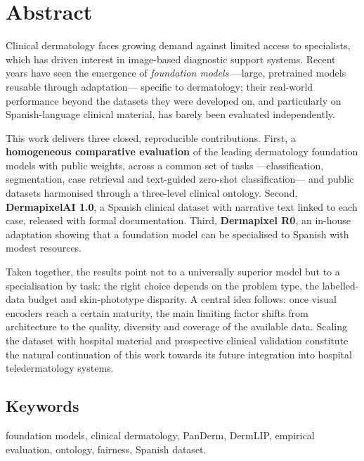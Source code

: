 
\chapter*{Abstract}
\vspace*{0.4cm}

Clinical dermatology faces growing demand against limited access to specialists, which has driven interest in image-based diagnostic support systems. Recent years have seen the emergence of \emph{foundation models} ---large, pretrained models reusable through adaptation--- specific to dermatology; their real-world performance beyond the datasets they were developed on, and particularly on Spanish-language clinical material, has barely been evaluated independently.
\par This work delivers three closed, reproducible contributions. First, a \textbf{homogeneous comparative evaluation} of the leading dermatology foundation models with public weights, across a common set of tasks ---classification, segmentation, case retrieval and text-guided zero-shot classification--- and public datasets harmonised through a three-level clinical ontology. Second, \textbf{DermapixelAI 1.0}, a Spanish clinical dataset with narrative text linked to each case, released with formal documentation. Third, \textbf{Dermapixel R0}, an in-house adaptation showing that a foundation model can be specialised to Spanish with modest resources.
\par Taken together, the results point not to a universally superior model but to a specialisation by task: the right choice depends on the problem type, the labelled-data budget and skin-phototype disparity. A central idea follows: once visual encoders reach a certain maturity, the main limiting factor shifts from architecture to the quality, diversity and coverage of the available data. Scaling the dataset with hospital material and prospective clinical validation constitute the natural continuation of this work towards its future integration into hospital teledermatology systems.

\vspace*{-0.4cm}
\section*{Keywords}
foundation models, clinical dermatology, PanDerm, DermLIP, empirical
evaluation, ontology, fairness, Spanish dataset.
